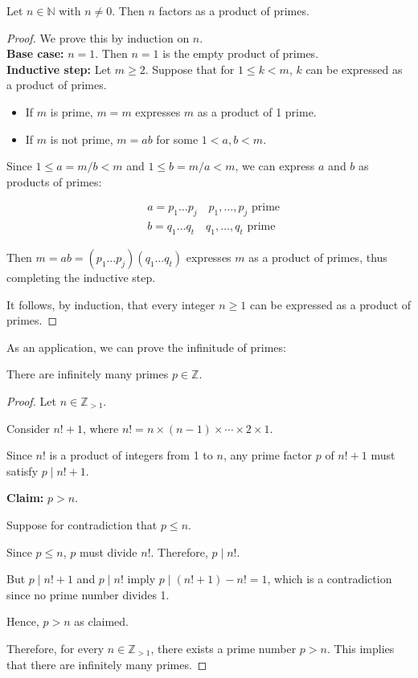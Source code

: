 \documentclass[11pt, draft]{article}
\begin{document}
\begin{proposition} Let \(n \in \mathbb{N}\) with \(n \neq 0\). Then \(n\) factors as a product of primes.
\end{proposition}
\begin{proof}
    We prove this by induction on \(n\). \\
    \textbf{Base case:} \(n = 1\). Then \(n = 1\) is the empty product of primes.\\
    \textbf{Inductive step:} Let \(m \geq 2\). Suppose that for \(1 \leq k < m\), \(k\) can be expressed as a product of primes.

    \begin{itemize}
        \item If \(m\) is prime, \(m = m\) expresses \(m\) as a product of 1 prime.
        \item If \(m\) is not prime, \(m = ab\) for some \(1 < a, b < m\).
    \end{itemize}

    Since \(1 \leq a = m / b < m\) and \(1 \leq b = m / a < m\), we can express
    \(a\) and \(b\) as products of primes:

    \[
        \begin{aligned}
             & a = p_1 \ldots p_j \quad p_1, \ldots, p_j \text{ prime} \\
             & b = q_1 \ldots q_t \quad q_1, \ldots, q_t \text{ prime}
        \end{aligned}
    \]

    Then \(m = ab = (p_1 \ldots p_j)(q_1 \ldots q_t)\) expresses \(m\) as a product
    of primes, thus completing the inductive step.

    It follows, by induction, that every integer \(n \geq 1\) can be expressed as a
    product of primes.
\end{proof}
As an application, we can prove the infinitude of primes:

\begin{theorem}
    There are infinitely many primes \(p \in \mathbb{Z}\).
\end{theorem}

\begin{proof}
    Let \(n \in \mathbb{Z}_{>1}\).

    Consider \(n! + 1\), where \(n! = n \times (n-1) \times \cdots \times 2 \times
    1\).

    Since \(n!\) is a product of integers from 1 to \(n\), any prime factor \(p\)
    of \(n! + 1\) must satisfy \(p \mid n! + 1\).

    \textbf{Claim:} \(p > n\).

    Suppose for contradiction that \(p \leq n\).

    Since \(p \leq n\), \(p\) must divide \(n!\). Therefore, \(p \mid n!\).

    But \(p \mid n! + 1\) and \(p \mid n!\) imply \(p \mid (n! + 1) - n! = 1\),
    which is a contradiction since no prime number divides 1.

    Hence, \(p > n\) as claimed.

    Therefore, for every \(n \in \mathbb{Z}_{>1}\), there exists a prime number \(p
    > n\). This implies that there are infinitely many primes.
\end{proof}
\end{document}
